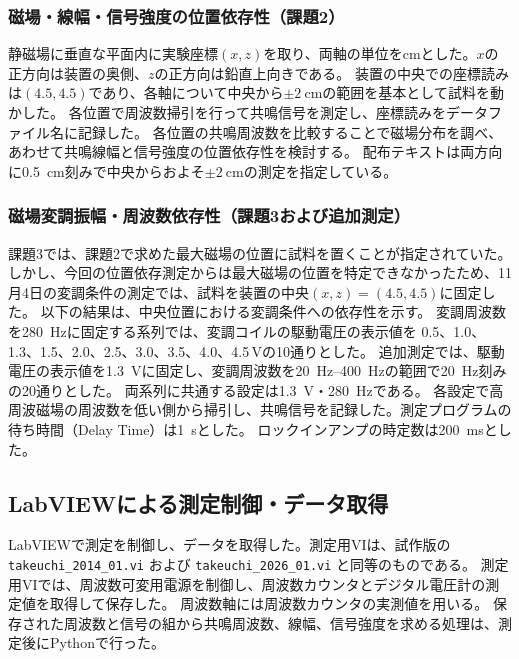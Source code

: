 \documentclass[dvipdfmx,a4paper,11pt]{jsarticle}
\begin{document}
\subsubsection{磁場・線幅・信号強度の位置依存性（課題2）}
静磁場に垂直な平面内に実験座標$(x,z)$を取り、両軸の単位を\si{\centi\metre}とした。$x$の正方向は装置の奥側、$z$の正方向は鉛直上向きである。
装置の中央での座標読みは$(4.5,4.5)$であり、各軸について中央から$\pm\SI{2}{\centi\metre}$の範囲を基本として試料を動かした。
各位置で周波数掃引を行って共鳴信号を測定し、座標読みをデータファイル名に記録した。
各位置の共鳴周波数を比較することで磁場分布を調べ、あわせて共鳴線幅と信号強度の位置依存性を検討する。
配布テキストは両方向に\SI{0.5}{\centi\metre}刻みで中央からおよそ$\pm\SI{2}{\centi\metre}$の測定を指定している\cite{manual}。


\subsubsection{磁場変調振幅・周波数依存性（課題3および追加測定）}
課題3では、課題2で求めた最大磁場の位置に試料を置くことが指定されていた\cite{manual}。
しかし、今回の位置依存測定からは最大磁場の位置を特定できなかったため、11月4日の変調条件の測定では、試料を装置の中央$(x,z)=(4.5,4.5)$に固定した。
以下の結果は、中央位置における変調条件への依存性を示す。
変調周波数を\SI{280}{\hertz}に固定する系列では、変調コイルの駆動電圧の表示値を
0.5、1.0、1.3、1.5、2.0、2.5、3.0、3.5、4.0、4.5\,Vの10通りとした。
追加測定では、駆動電圧の表示値を\SI{1.3}{\volt}に固定し、変調周波数を\SIrange{20}{400}{\hertz}の範囲で\SI{20}{\hertz}刻みの20通りとした。
両系列に共通する設定は\SI{1.3}{\volt}・\SI{280}{\hertz}である。
各設定で高周波磁場の周波数を低い側から掃引し、共鳴信号を記録した。測定プログラムの待ち時間（Delay Time）は\SI{1}{\second}とした。
ロックインアンプの時定数は\SI{200}{\milli\second}とした。


\subsection{LabVIEWによる測定制御・データ取得}
LabVIEWで測定を制御し、データを取得した。測定用VIは、試作版の \texttt{takeuchi\_2014\_01.vi} および \texttt{takeuchi\_2026\_01.vi} と同等のものである。
測定用VIでは、周波数可変用電源を制御し、周波数カウンタとデジタル電圧計の測定値を取得して保存した。
周波数軸には周波数カウンタの実測値を用いる。
保存された周波数と信号の組から共鳴周波数、線幅、信号強度を求める処理は、測定後にPythonで行った。
\end{document}
